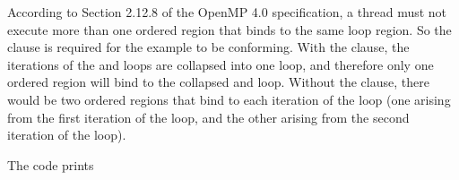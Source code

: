 According to Section 2.12.8 of the OpenMP 4.0 specification, 
a thread must not execute more than one ordered region that binds 
to the same loop region. So the  clause is required for the example 
to be conforming. With the  clause, the iterations of the  
and  loops are collapsed into one loop, and therefore only one ordered 
region will bind to the collapsed  and  loop. Without the  
clause, there would be two ordered regions that bind to each iteration of the  
loop (one arising from the first iteration of the  loop, and the other 
arising from the second iteration of the  loop).

The code prints

\\
\\
\\
\\
\\




